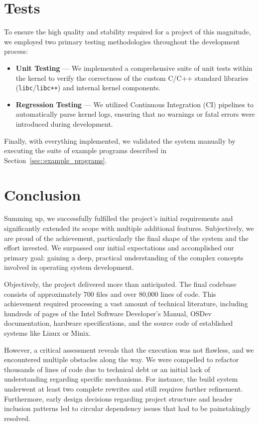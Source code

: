 \documentclass[a4paper,10pt,twoside]{report}
\theoremstyle{definition}
\begin{document}
\section{Tests}

To ensure the high quality and stability required for a project of this magnitude, we employed two primary testing methodologies throughout the development process:

\begin{itemize}
    \item \textbf{Unit Testing} --- We implemented a comprehensive suite of unit tests within the kernel to verify the correctness of the custom C/C++ standard libraries (\texttt{libc}/\texttt{libc++}) and internal kernel components.
    \item \textbf{Regression Testing} --- We utilized Continuous Integration (CI) pipelines to automatically parse kernel logs, ensuring that no warnings or fatal errors were introduced during development.
\end{itemize}

Finally, with everything implemented, we validated the system manually by executing the suite of example programs described in Section~\ref{sec::example_programs}.

\section{Conclusion}

Summing up, we successfully fulfilled the project's initial requirements and significantly extended its scope with multiple additional features. Subjectively, we are proud of the achievement, particularly the final shape of the system and the effort invested. We surpassed our initial expectations and accomplished our primary goal: gaining a deep, practical understanding of the complex concepts involved in operating system development.

Objectively, the project delivered more than anticipated. The final codebase consists of approximately 700 files and over 80,000 lines of code. This achievement required processing a vast amount of technical literature, including hundreds of pages of the Intel Software Developer's Manual, OSDev documentation, hardware specifications, and the source code of established systems like Linux or Minix.

However, a critical assessment reveals that the execution was not flawless, and we encountered multiple obstacles along the way. We were compelled to refactor thousands of lines of code due to technical debt or an initial lack of understanding regarding specific mechanisms. For instance, the build system underwent at least two complete rewrites and still requires further refinement. Furthermore, early design decisions regarding project structure and header inclusion patterns led to circular dependency issues that had to be painstakingly resolved.
\end{document}
